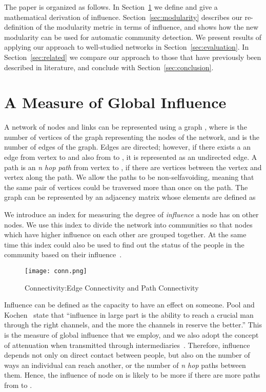 \documentclass{sig-alternate}
\newcommand{\secref}[1]{Section~\ref{#1}}
\begin{document}
The paper is organized as follows. In \secref{sec:influence} we define and give a mathematical derivation of influence. \secref{sec:modularity} describes our re-definition of the modularity metric in terms of influence, and shows how the new modularity can be used for automatic community detection. We present results of applying our approach to well-studied networks in \secref{sec:evaluation}. In \secref{sec:related} we compare our approach to those that have previously been described in literature, and conclude with \secref{sec:conclusion}.







\section{A Measure of  Global Influence}
\label{sec:influence}
A network  of  nodes and   links can be represented  using a graph , where   is the number of vertices of the graph representing the nodes of the network, and  is the number of edges of the graph. Edges are directed; however, if there exists a an edge from vertex  to  and also from  to , it is represented as an undirected edge. A path   is an \emph{n  hop path} from  vertex   to ,  if there are  vertices between the vertex  and vertex   along the path. We allow the paths to be non-selfavoiding, meaning that the same pair of vertices could be traversed more than once on the path. The graph  can be represented by an adjacency matrix  whose elements  are defined as
 



We introduce an index for measuring the degree of \emph{influence} a node has on other nodes. We use this index to divide the network into communities  so that nodes which have higher influence on each other are grouped together. At the same time this index could also be used to find out the status of the people in the community based on their influence~\cite{Katz}.


  \begin{figure}[tbh]
 \texttt{[image: conn.png]}
 \caption{Connectivity:Edge Connectivity and Path Connectivity}
 \label{fig:conn}
 \end{figure}



Influence can be defined as the capacity to have an effect on someone. Pool and Kochen~\cite{Pool}  state that  ``influence in large part is the ability to reach a crucial man through the right channels, and the more the channels in reserve the better.'' This is the measure of global influence that we employ, and we also adopt the concept of attenuation when transmitted  through intermediaries~\cite{Katz}. Therefore, influence depends not only on direct contact between people, but also on the number of ways an individual can reach another, or the number of \emph{n hop} paths between them. Hence, the influence of node  on  is likely to be more if there are more paths from  to .
\end{document}
